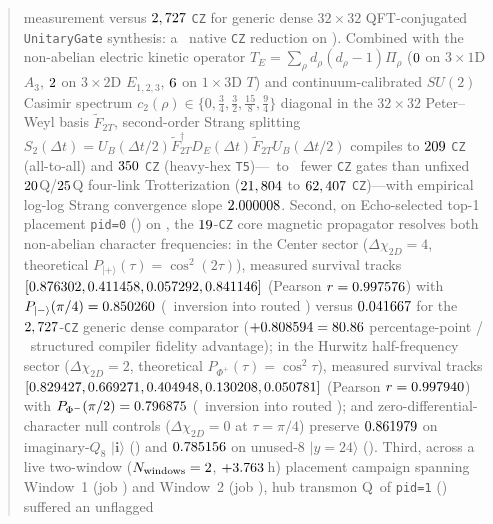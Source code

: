 \documentclass[aps,prx,twocolumn,superscriptaddress,nofootinbib]{revtex4-2}
\begin{document}
\begin{abstract}
measurement versus $\BTPlaqFezCzCenterGeneric$ \texttt{CZ} for generic dense $32\times 32$ QFT-conjugated \texttt{UnitaryGate} synthesis: a \BTPlaqFezCzReductionRatio\ native \texttt{CZ} reduction on \BTPlaqFezBackend). Combined with the non-abelian electric kinetic operator $T_E = \sum_\rho d_\rho(d_\rho - 1)\Pi_\rho$ ($\BTPlaqKinDimOneD$ on $3\times 1\mathrm{D}$ $A_3$, $\BTPlaqKinDimTwoD$ on $3\times 2\mathrm{D}$ $E_{1,2,3}$, $\BTPlaqKinDimThreeD$ on $1\times 3\mathrm{D}$ $T$) and continuum-calibrated $SU(2)$ Casimir spectrum $c_2(\rho) \in \{0, \tfrac{3}{4}, \tfrac{3}{2}, \tfrac{15}{8}, \tfrac{9}{4}\}$ diagonal in the $32\times 32$ Peter--Weyl basis $\widetilde{F}_{2T}$, second-order Strang splitting $S_2(\Delta t) = U_B(\Delta t/2)\widetilde{F}_{2T}^\dagger D_E(\Delta t)\widetilde{F}_{2T} U_B(\Delta t/2)$ compiles to $\BTPlaqStrangAtaCz$ \texttt{CZ} (all-to-all) and $\BTPlaqStrangTfCz$ \texttt{CZ} (heavy-hex \texttt{T5})---\BTPlaqCompTwentyQAtaRatio\ to \BTPlaqCompTwentyFiveQHhRatio\ fewer \texttt{CZ} gates than unfixed $\BTPlaqFourLinkInplaceQubits$Q/$\BTPlaqFourLinkAncillaQubits$Q four-link Trotterization ($\BTPlaqFourLinkInplaceAtaCz$ to $\BTPlaqFourLinkAncillaHhCz$ \texttt{CZ})---with empirical log-log Strang convergence slope $\BTPlaqStrangSlopeGOne$. Second, on Echo-selected top-1 placement \texttt{pid=0} (\BTPlaqPidZeroQubits) on \BTPlaqFezBackend, the $\BTPlaqUbTfCoreCz$-\texttt{CZ} core magnetic propagator resolves both non-abelian character frequencies: in the Center sector ($\Delta\chi_{2D} = 4$, theoretical $P_{|+\rangle}(\tau) = \cos^2(2\tau)$), measured survival tracks $[\BTPlaqPidZeroCenterTZero, \BTPlaqPidZeroCenterPiEight, \BTPlaqPidZeroCenterPiFourPlus, \BTPlaqPidZeroCenterPiTwo]$ (Pearson $r = \BTPlaqPidZeroPearsonCenter$) with $P_{|-\rangle}(\pi/4) = \BTPlaqPidZeroCenterPiFourMinus$ (\BTPlaqPidZeroCenterPiFourMinusPct\ inversion into routed \BTPlaqRoutedBitsCenterInv) versus $\BTPlaqPidZeroCenterGenericMinus$ for the $\BTPlaqFezCzCenterGeneric$-\texttt{CZ} generic dense comparator ($+\BTPlaqPidZeroCenterStructAdv = \BTPlaqPidZeroCenterStructAdvPp$ percentage-point / \BTPlaqPidZeroCenterStructFidelityRatio\ structured compiler fidelity advantage); in the Hurwitz half-frequency sector ($\Delta\chi_{2D} = 2$, theoretical $P_{\Phi^+}(\tau) = \cos^2\tau$), measured survival tracks $[\BTPlaqPidZeroHurwitzTZero, \BTPlaqPidZeroHurwitzPiEight, \BTPlaqPidZeroHurwitzPiFour, \BTPlaqPidZeroHurwitzThreePiEight, \BTPlaqPidZeroHurwitzPiTwoPlus]$ (Pearson $r = \BTPlaqPidZeroPearsonHurwitz$) with $P_{\Phi^-}(\pi/2) = \BTPlaqPidZeroHurwitzPiTwoMinus$ (\BTPlaqPidZeroHurwitzPiTwoMinusPct\ inversion into routed \BTPlaqRoutedBitsHurwitzInv); and zero-differential-character null controls ($\Delta\chi_{2D} = 0$ at $\tau = \pi/4$) preserve $\BTPlaqPidZeroImagNullSurv$ on imaginary-$Q_8$ $|\mathbf{i}\rangle$ (\BTPlaqRoutedBitsImagNull) and $\BTPlaqPidZeroUnusedNullSurv$ on unused-$8$ $|y=24\rangle$ (\BTPlaqRoutedBitsUnusedNull). Third, across a live two-window ($N_{\mathrm{windows}} = \BTPlaqEchoNumWindows$, $+\BTPlaqEchoElapsedHours$\,h) placement campaign spanning Window~1 (job \BTPlaqFezWindowOneJobId) and Window~2 (job \BTPlaqFezJobId), hub transmon Q\BTPlaqDriftedHubQubit\ of \texttt{pid=1} (\BTPlaqPidOneQubits) suffered an unflagged 
\end{abstract}
\end{document}
